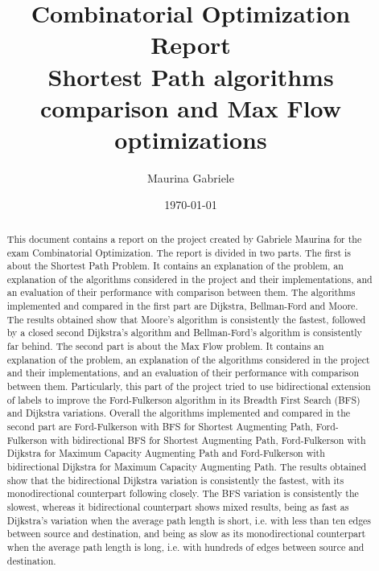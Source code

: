 \documentclass{article}
\title{Combinatorial Optimization Report\\[1ex]
\large Shortest Path algorithms comparison and Max Flow optimizations}
\author{Maurina Gabriele}
\date{\today}
\begin{document}
\begin{titlepage}
\maketitle
\end{titlepage}

\begin{abstract}
This document contains a report on the project created by Gabriele Maurina for the exam Combinatorial Optimization.
The report is divided in two parts. The first is about the Shortest Path Problem. It contains an explanation of the problem,
an explanation of the algorithms considered in the project and their implementations, and an evaluation of their performance
with comparison between them. The algorithms implemented and compared in the first part are Dijkstra, Bellman-Ford and Moore.
The results obtained show that Moore's algorithm is consistently the fastest, followed by a closed second Dijkstra's algorithm
and Bellman-Ford's algorithm is consistently far behind.
The second part is about the Max Flow problem. It contains an explanation of the problem, an explanation of the algorithms considered in the project and
their implementations, and an evaluation of their performance with comparison between them. Particularly, this part of the project tried to
use bidirectional extension of labels to improve the Ford-Fulkerson algorithm in its Breadth First Search (BFS) and Dijkstra variations. Overall the algorithms implemented
and compared in the second part are Ford-Fulkerson with BFS for Shortest Augmenting Path, Ford-Fulkerson with bidirectional BFS for Shortest Augmenting Path,
Ford-Fulkerson with Dijkstra for Maximum Capacity Augmenting Path and Ford-Fulkerson with bidirectional Dijkstra for Maximum Capacity Augmenting Path.
The results obtained show that the bidirectional Dijkstra variation is consistently the fastest, with its monodirectional counterpart following closely.
The BFS variation is consistently the slowest, whereas it bidirectional counterpart shows mixed results, being as fast as Dijkstra's variation
when the average path length is short, i.e. with less than ten edges between source and destination, and being as slow as its monodirectional
counterpart when the average path length is long, i.e. with hundreds of edges between source and destination.
\end{abstract}

\tableofcontents




\end{document}
